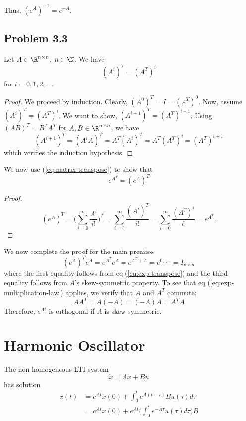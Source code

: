 \documentclass{homework}
\begin{document}
Thus, $(e^A)^{-1} = e^{-A}$.

\subsection{Problem 3.3}

Let $A\in\R^{n \times n}$, $n\in\N$. We have
\begin{equation}
    (A^i)^T = (A^T)^i
    \label{eq:matrix-transpose}
\end{equation}
for $i=0,1,2,\dots$.

\begin{proof}
    We proceed by induction. Clearly, $(A^0)^T = I = (A^T)^0$. Now, assume
    $(A^i)^T = (A^T)^i$. We want to show, $(A^{i+1})^T = (A^T)^{i+1}$. Using
    $(AB)^T = B^T A^T$ for $A,B\in\R^{n\times n}$, we have
    \begin{equation}
        (A^{i+1})^T = (A^i A)^T = A^T(A^i)^T = A^T(A^T)^i = (A^T)^{i+1}
    \end{equation}
    which verifies the induction hypothesis.
\end{proof}

We now use (\ref{eq:matrix-transpose}) to show that
\begin{equation}
    e^{A^T} = (e^A)^T
    \label{eq:exp-transpose}
\end{equation}
\begin{proof}
    \begin{equation}
        (e^A)^T = \biggl(\sum_{i=0}^{\infty} \frac{A^i}{i!}\biggr)^T
            = \sum_{i=0}^{\infty} \frac{(A^i)^T}{i!}
            = \sum_{i=0}^{\infty} \frac{(A^T)^i}{i!}
            = e^{A^T}.
    \end{equation}
\end{proof}

We now complete the proof for the main premise:
\begin{equation}
    (e^A)^T e^A = e^{A^T}e^A = e^{A^T + A} = e^{0_{n \times n}} = I_{n\times n}
\end{equation}
where the first equality follows from eq (\ref{eq:exp-transpose}) and the third
equality follows from $A$'s skew-symmetric property. To see that eq
(\ref{eq:exp-multiplication-law}) applies, we verify that $A$ and $A^T$
commute:
\begin{equation}
    AA^T = A(-A) = (-A)A = A^TA
\end{equation}
Therefore, $e^{At}$ is orthogonal if $A$ is skew-symmetric.

\section{Harmonic Oscillator}
The non-homogeneous LTI system
\begin{equation}
    \dot{x} = Ax + Bu
\end{equation}
has solution
\begin{align}
    x(t) &= e^{At}x(0) + \int_{0}^{t}e^{A(t-\tau)}Bu(\tau)d\tau \\
        &= e^{At}x(0) + e^{At}
            \biggl( \int_{0}^{t} e^{-A\tau}u(\tau)d\tau \biggr)
            B
\end{align}
\end{document}
